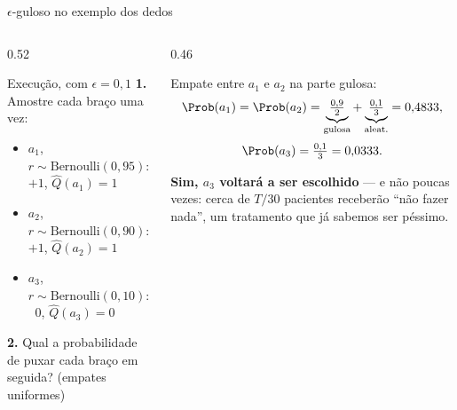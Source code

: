 \documentclass[aspectratio=169, 10pt]{beamer}
\newcommand{\Qhat}{\widehat{Q}}
\newcommand{\Ber}{\mathrm{Bernoulli}}
\begin{document}
\begin{frame}{$\epsilon$-guloso no exemplo dos dedos}
  \begin{columns}[T]
    \begin{column}{0.52\textwidth}
      \begin{algbox}{Execução, com $\epsilon = 0{,}1$}
        \textbf{1.} Amostre cada braço uma vez:
        \begin{itemize}\setlength{\itemsep}{0.1ex}\small
          \item $a_1$, $r \sim \Ber(0{,}95)$: $+1$, $\Qhat(a_1) = 1$
          \item $a_2$, $r \sim \Ber(0{,}90)$: $+1$, $\Qhat(a_2) = 1$
          \item $a_3$, $r \sim \Ber(0{,}10)$: $\;\;0$, $\Qhat(a_3) = 0$
        \end{itemize}
        \textbf{2.} Qual a probabilidade de puxar cada braço em seguida?
        (empates uniformes)
      \end{algbox}
    \end{column}
    \begin{column}{0.46\textwidth}
      \pause
      \begin{respbox}
        Empate entre $a_1$ e $a_2$ na parte gulosa:
        \[
          \Prob(a_1) = \Prob(a_2)
            = \underbrace{\tfrac{0{,}9}{2}}_{\text{gulosa}}
            + \underbrace{\tfrac{0{,}1}{3}}_{\text{aleat.}}
            = 0{,}4833,
        \]
        \[
          \Prob(a_3) = \tfrac{0{,}1}{3} = 0{,}0333.
        \]
      \end{respbox}
      \pause
      \begin{ideiabox}
        \textbf{Sim, $a_3$ voltará a ser escolhido} --- e não poucas vezes:
        cerca de $T/30$ pacientes receberão ``não fazer nada'', um
        tratamento que já sabemos ser péssimo.
      \end{ideiabox}
    \end{column}
  \end{columns}
\end{frame}
\end{document}
